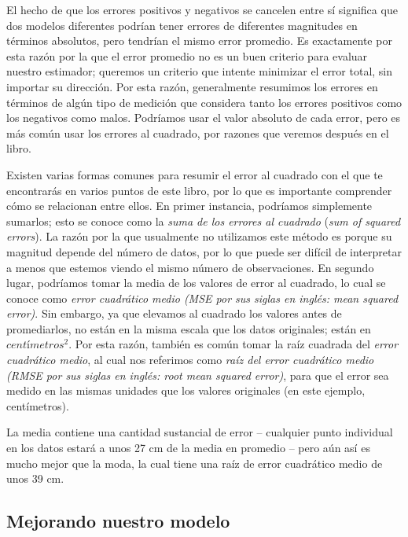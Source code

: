\documentclass[
  12pt,
]{book}
\begin{document}
El hecho de que los errores positivos y negativos se cancelen entre sí significa que dos modelos diferentes podrían tener errores de diferentes magnitudes en términos absolutos, pero tendrían el mismo error promedio. Es exactamente por esta razón por la que el error promedio no es un buen criterio para evaluar nuestro estimador; queremos un criterio que intente minimizar el error total, sin importar su dirección. Por esta razón, generalmente resumimos los errores en términos de algún tipo de medición que considera tanto los errores positivos como los negativos como malos. Podríamos usar el valor absoluto de cada error, pero es más común usar los errores al cuadrado, por razones que veremos después en el libro.

Existen varias formas comunes para resumir el error al cuadrado con el que te encontrarás en varios puntos de este libro, por lo que es importante comprender cómo se relacionan entre ellos. En primer instancia, podríamos simplemente sumarlos; esto se conoce como la \emph{suma de los errores al cuadrado} (\emph{sum of squared errors}). La razón por la que usualmente no utilizamos este método es porque su magnitud depende del número de datos, por lo que puede ser difícil de interpretar a menos que estemos viendo el mismo número de observaciones. En segundo lugar, podríamos tomar la media de los valores de error al cuadrado, lo cual se conoce como \emph{error cuadrático medio (MSE por sus siglas en inglés: mean squared error)}. Sin embargo, ya que elevamos al cuadrado los valores antes de promediarlos, no están en la misma escala que los datos originales; están en \(centímetros^2\). Por esta razón, también es común tomar la raíz cuadrada del \emph{error cuadrático medio}, al cual nos referimos como \emph{raíz del error cuadrático medio (RMSE por sus siglas en inglés: root mean squared error)}, para que el error sea medido en las mismas unidades que los valores originales (en este ejemplo, centímetros).

La media contiene una cantidad sustancial de error -- cualquier punto individual en los datos estará a unos 27 cm de la media en promedio -- pero aún así es mucho mejor que la moda, la cual tiene una raíz de error cuadrático medio de unos 39 cm.

\hypertarget{mejorando-nuestro-modelo}{%
\subsection{Mejorando nuestro modelo}\label{mejorando-nuestro-modelo}}
\end{document}
